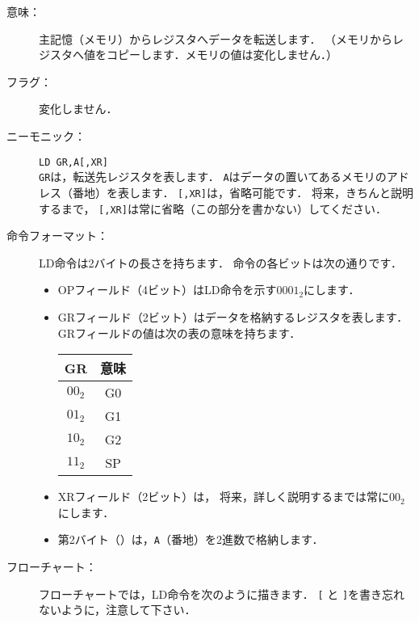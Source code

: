 \begin{description}
\item[意味：]主記憶（メモリ）からレジスタへデータを転送します．
（メモリからレジスタへ値をコピーします．メモリの値は変化しません．） 

\item[フラグ：]変化しません．

\item[ニーモニック：]{\tt LD  GR,A[,XR]} \\
{\tt GR}は，転送先レジスタを表します．
{\tt A}はデータの置いてあるメモリのアドレス（番地）を表します．
{\tt [,XR]}は，省略可能です．
将来，きちんと説明するまで，
{\tt [,XR]}は常に省略（この部分を書かない）してください．

\item[命令フォーマット：]LD命令は2バイトの長さを持ちます．
命令の各ビットは次の通りです．


\begin{itemize}
\item OPフィールド（4ビット）はLD命令を示す$0001_2$にします．
\item GRフィールド（2ビット）はデータを格納するレジスタを表します．
GRフィールドの値は次の表の意味を持ちます．

{\small\begin{center}
\begin{tabular}{c|c} \hline\hline
 GR & 意味 \\
\hline
$00_2$ & G0 \\
$01_2$ & G1 \\
$10_2$ & G2 \\
$11_2$ & SP \\
\end{tabular}
\end{center}}

\item XRフィールド（2ビット）は，
将来，詳しく説明するまでは常に$00_2$にします．
\item 第2バイト（\A）は，{\tt A}（番地）を2進数で格納します．
\end{itemize}

\item[フローチャート：]フローチャートでは，LD命令を次のように描きます．
{\tt [} と {\tt ]}を書き忘れないように，注意して下さい．

\begin{center}
\end{center}


\end{description}
